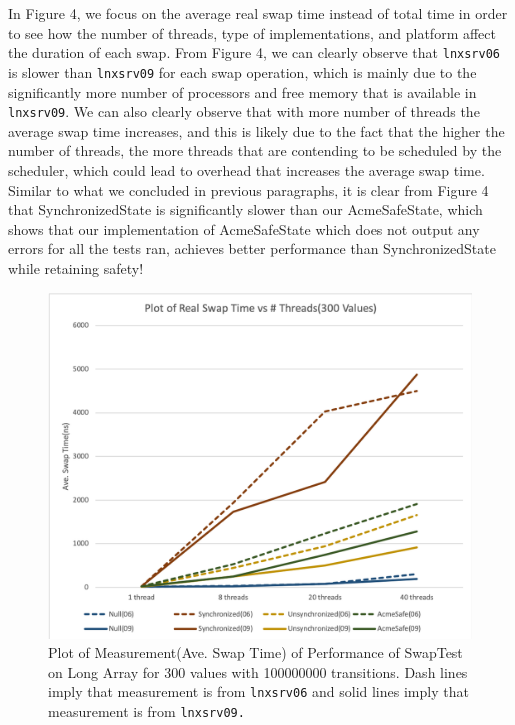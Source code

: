 In Figure 4, we focus on the average real swap time instead of total time in order to see how the number of threads, type of implementations, and platform affect the duration of each swap. From Figure 4, we can clearly observe that \texttt{lnxsrv06} is slower than \texttt{lnxsrv09} for each swap operation, which is mainly due to the significantly more number of processors and free memory that is available in \texttt{lnxsrv09}. We can also clearly observe that with more number of threads the average swap time increases, and this is likely due to the fact that the higher the number of threads, the more threads that are contending to be scheduled by the scheduler, which could lead to overhead that increases the average swap time. Similar to what we concluded in previous paragraphs, it is clear from Figure 4 that SynchronizedState is significantly slower than our AcmeSafeState, which shows that our implementation of AcmeSafeState which does not output any errors for all the tests ran, achieves better performance than SynchronizedState while retaining safety!

\begin{figure}
\includegraphics[scale=0.45]{swaptime-value300.png}
\caption{\label{fig:vectors} Plot of Measurement(Ave. Swap Time) of Performance of SwapTest on Long Array for 300 values with 100000000 transitions. Dash lines imply that measurement is from \texttt{lnxsrv06} and solid lines imply that measurement is from \texttt{lnxsrv09.} }
\end{figure}


